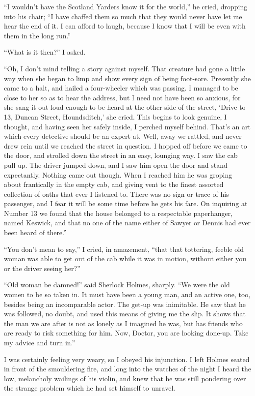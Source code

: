 \documentclass[12pt,english]{book}
\begin{document}
{}``I wouldn't have the Scotland Yarders know it for the world,''
he cried, dropping into his chair; {}``I have chaffed them so much
that they would never have let me hear the end of it. I can afford
to laugh, because I know that I will be even with them in the long
run.''

{}``What is it then?'' I asked.

{}``Oh, I don't mind telling a story against myself. That creature
had gone a little way when she began to limp and show every sign of
being foot-sore. Presently she came to a halt, and hailed a four-wheeler
which was passing. I managed to be close to her so as to hear the
address, but I need not have been so anxious, for she sang it out
loud enough to be heard at the other side of the street, `Drive to
13, Duncan Street, Houndsditch,' she cried. This begins to look genuine,
I thought, and having seen her safely inside, I perched myself behind.
That's an art which every detective should be an expert at. Well,
away we rattled, and never drew rein until we reached the street in
question. I hopped off before we came to the door, and strolled down
the street in an easy, lounging way. I saw the cab pull up. The driver
jumped down, and I saw him open the door and stand expectantly. Nothing
came out though. When I reached him he was groping about frantically
in the empty cab, and giving vent to the finest assorted collection
of oaths that ever I listened to. There was no sign or trace of his
passenger, and I fear it will be some time before he gets his fare.
On inquiring at Number 13 we found that the house belonged to a respectable
paperhanger, named Keswick, and that no one of the name either of
Sawyer or Dennis had ever been heard of there.''

{}``You don't mean to say,'' I cried, in amazement, {}``that that
tottering, feeble old woman was able to get out of the cab while it
was in motion, without either you or the driver seeing her?''

{}``Old woman be damned!'' said Sherlock Holmes, sharply. {}``We
were the old women to be so taken in. It must have been a young man,
and an active one, too, besides being an incomparable actor. The get-up
was inimitable. He saw that he was followed, no doubt, and used this
means of giving me the slip. It shows that the man we are after is
not as lonely as I imagined he was, but has friends who are ready
to risk something for him. Now, Doctor, you are looking done-up. Take
my advice and turn in.''

I was certainly feeling very weary, so I obeyed his injunction. I
left Holmes seated in front of the smouldering fire, and long into
the watches of the night I heard the low, melancholy wailings of his
violin, and knew that he was still pondering over the strange problem
which he had set himself to unravel.
\end{document}
